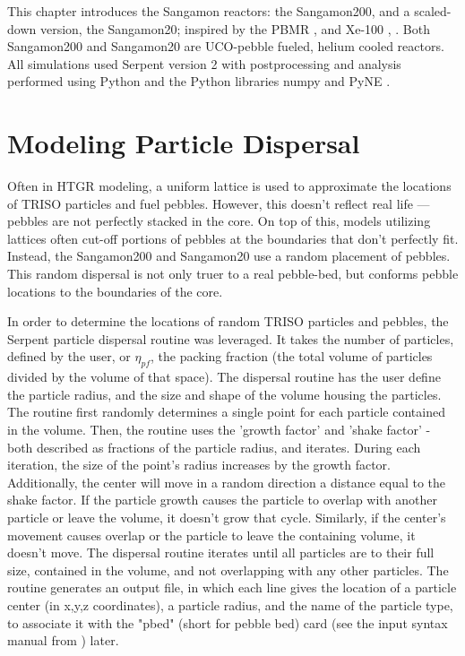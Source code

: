 This chapter introduces the Sangamon reactors:  the Sangamon200, and a scaled-down version, the Sangamon20; inspired by the PBMR \cite{venter_pbmr_2005}, \cite{noauthor_pebble_2017} and Xe-100 \cite{harlan_ans_2017}, \cite{harlan_x-energy_2018}.  Both Sangamon200 and Sangamon20 are UCO-pebble fueled, helium cooled reactors.  All simulations used Serpent version 2 \cite{leppanenjaakko_serpent_2015} with postprocessing and analysis performed using Python \cite{van_rossum_python_nodate} and the Python libraries numpy \cite{harris_array_2020} and PyNE \cite{scopatz_pyne:_2012}.  

\section{Modeling Particle Dispersal}

Often in HTGR modeling, a uniform lattice is used to approximate the locations of TRISO particles and fuel pebbles.  However, this doesn't reflect real life --- pebbles are not perfectly stacked in the core.  On top of this, models utilizing lattices often cut-off portions of pebbles at the boundaries that don't perfectly fit.  Instead, the Sangamon200 and Sangamon20 use a random placement of pebbles.  This random dispersal is not only truer to a real pebble-bed, but conforms pebble locations to the boundaries of the core.

In order to determine the locations of random TRISO particles and pebbles, the Serpent particle dispersal routine was leveraged.  It takes the number of particles, defined by the user, or $\eta_{pf}$, the packing fraction (the total volume of particles divided by the volume of that space).  The dispersal routine has the user define the particle radius, and the size and shape of the volume housing the particles.  The routine first randomly determines a single point for each particle contained in the volume.  Then, the routine uses the 'growth factor' and 'shake factor' - both described as fractions of the particle radius, and iterates.  During each iteration, the size of the point's radius increases by the growth factor.  Additionally, the center will move in a random direction a distance equal to the shake factor.  If the particle growth causes the particle to overlap with another particle or leave the volume, it doesn't grow that cycle.  Similarly, if the center's movement causes overlap or the particle to leave the containing volume, it doesn't move.  The dispersal routine iterates until all particles are to their full size, contained in the volume, and not overlapping with any other particles.  The routine generates an output file, in which each line gives the location of a particle center (in x,y,z coordinates), a particle radius, and the name of the particle type, to associate it with the "pbed" (short for pebble bed) card (see the input syntax manual from \cite{leppanenjaakko_serpent_2015}) later.

